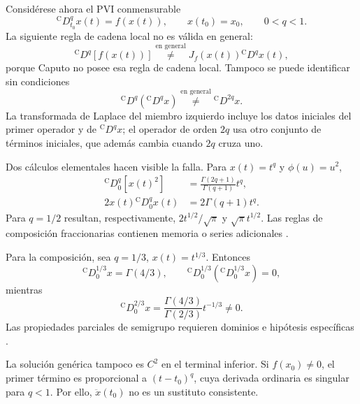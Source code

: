 Considérese ahora el PVI conmensurable
\begin{equation}
 {}^{\mathrm C}D_{t_0}^{q}x(t)=f(x(t)),
 \qquad x(t_0)=x_0,\qquad 0<q<1.
 \label{eq:pp-caputo-ivp}
\end{equation}
La siguiente regla de cadena local no es válida en general:
\begin{equation}
 {}^{\mathrm C}D^q[f(x(t))]
 \stackrel{\text{en general}}{\neq}
 J_f(x(t)){}^{\mathrm C}D^q x(t),
 \label{eq:pp-false-chain-rule}
\end{equation}
porque Caputo no posee esa regla de cadena local. Tampoco se puede identificar
sin condiciones
\begin{equation}
 {}^{\mathrm C}D^q({}^{\mathrm C}D^q x)
 \stackrel{\text{en general}}{\neq}
 {}^{\mathrm C}D^{2q}x.
 \label{eq:pp-no-semigroup}
\end{equation}
La transformada de Laplace del miembro izquierdo incluye los datos iniciales
del primer operador y de \({}^{\mathrm C}D^qx\); el operador de orden \(2q\)
usa otro conjunto de términos iniciales, que además cambia cuando
\(2q\) cruza uno.

Dos cálculos elementales hacen visible la falla. Para \(x(t)=t^q\) y
\(\phi(u)=u^2\),
\begin{align}
 {}^{\mathrm C}D_0^q[x(t)^2]
 &=\frac{\Gamma(2q+1)}{\Gamma(q+1)}t^q,\\
 2x(t){}^{\mathrm C}D_0^qx(t)
 &=2\Gamma(q+1)t^q.
 \label{eq:pp-chain-counterexample}
\end{align}
Para \(q=1/2\) resultan, respectivamente,
\(2t^{1/2}/\sqrt\pi\) y \(\sqrt\pi t^{1/2}\). Las reglas de composición
fraccionarias contienen memoria o series adicionales
\cite{ShchedrinEtAl2018Composite}.

Para la composición, sea \(q=1/3\), \(x(t)=t^{1/3}\). Entonces
\begin{equation}
 {}^{\mathrm C}D_0^{1/3}x=\Gamma(4/3),\qquad
 {}^{\mathrm C}D_0^{1/3}({}^{\mathrm C}D_0^{1/3}x)=0,
\end{equation}
mientras
\begin{equation}
 {}^{\mathrm C}D_0^{2/3}x
 =\frac{\Gamma(4/3)}{\Gamma(2/3)}t^{-1/3}\neq0.
 \label{eq:pp-semigroup-counterexample}
\end{equation}
Las propiedades parciales de semigrupo requieren dominios e hipótesis
específicas \cite{Cong2023Semigroup}.

La solución genérica tampoco es \(C^2\) en el terminal inferior. Si
\(f(x_0)\neq0\), el primer término es proporcional a
\((t-t_0)^q\), cuya derivada ordinaria es singular para \(q<1\). Por ello,
\(\ddot x(t_0)\) no es un sustituto consistente.

